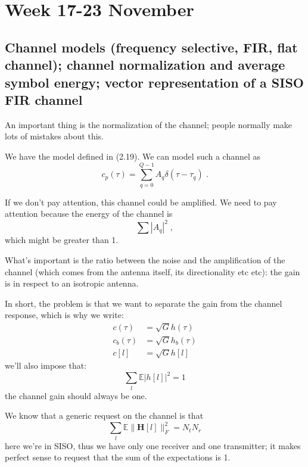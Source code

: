 \documentclass[a4paper, 12pt]{book}
\begin{document}
\setcounter{chapter}{3}
\chapter[ ]{Week 17-23 November}
\section[Channel models]{Channel models (frequency selective, FIR, flat channel); channel normalization and average symbol energy; vector representation of a SISO FIR channel}

An important thing is the normalization of the channel; people normally make lots of mistakes about this.

We have the model defined in (2.19).
We can model such a channel as
\begin{equation}
c_p(\tau) = \sum_{q=0}^{Q-1} A_q \delta(\tau - \tau_q) \;. \tag{2.19}
\end{equation}

If we don't pay attention, this channel could be amplified. We need to pay attention because the energy of the channel is
$$
\sum |A_q|^2 \;,
$$
which might be greater than 1.

\begin{tcolorbox}[sharp corners, boxrule=0pt, leftrule=2pt, colframe=green!60!black, colback=green!5, left=5pt, top=3pt, bottom=3pt]
    What's important is the ratio between the noise and the amplification of the channel (which comes from the antenna itself, its directionality etc etc): the gain is in respect to an isotropic antenna.
\end{tcolorbox}

In short, the problem is that we want to separate the gain from the channel response, which is why we write:
\begin{align}
c(\tau) &= \sqrt{G}h(\tau) \tag{2.64} \\
c_b(\tau) &= \sqrt{G}h_b(\tau) \tag{2.65} \\
c[l] &= \sqrt{G}h[l] \tag{2.66}
\end{align}
we'll also impose that:
\begin{equation}
\sum_{l} \mathbb{E}|h[l]|^2 = 1
\end{equation}
the channel gain should always be one.

\begin{remark}
We know that a generic request on the channel is that
\begin{equation*}
\sum_{l} \mathbb{E} \| \boldsymbol{H}[l] \|_F^2 = N_t N_r
\end{equation*}
here we're in SISO, thus we have only one receiver and one transmitter; it makes perfect sense to request that the sum of the expectations is 1.
\end{remark}
\end{document}
